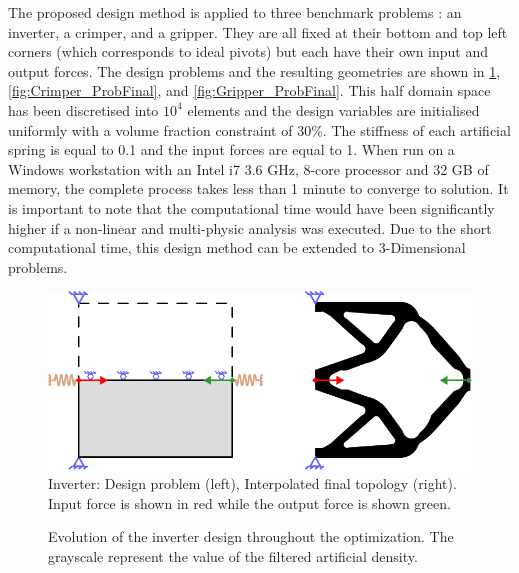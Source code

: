 The proposed design method is applied to three benchmark problems : an inverter, a crimper, and a gripper. They are all fixed at their bottom and top left corners (which corresponds to ideal pivots) but each have their own input and output forces. The design problems and the resulting geometries are shown in \cref{fig:Invert_ProbFinal}, \cref{fig:Crimper_ProbFinal}, and \cref{fig:Gripper_ProbFinal}. This half domain space has been discretised into $10^4$ elements and the design variables are initialised uniformly with a volume fraction constraint of 30\%. The stiffness of each artificial spring is equal to 0.1 and the input forces are equal to 1. When run on a Windows workstation with an Intel i7 3.6 GHz, 8-core processor and 32 GB of memory, the complete process takes less than 1 minute to converge to solution. It is important to note that the computational time would have been significantly higher if a non-linear and multi-physic analysis was executed. Due to the short computational time, this design method can be extended to 3-Dimensional problems.

\begin{figure}[hbt!]
    \centering
    \includegraphics[width=0.65\columnwidth]{images/chap5/Inverter_Schematic_FinalCAD.pdf}
    \caption[Inverter: Design problem (left), Interpolated final topology (right)]{Inverter: Design problem (left), Interpolated final topology (right). Input force is shown in red while the output force is shown green.}
    \label{fig:Invert_ProbFinal}
\end{figure}

\begin{figure}[hbt!]
    \centering
    
    \caption[Evolution of the inverter design throughout the optimization]{Evolution of the inverter design throughout the optimization. The grayscale represent the value of the filtered artificial density.}
    \label{fig:ForceInverter_evol}
\end{figure}

